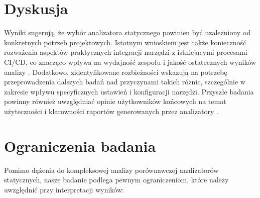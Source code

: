 \documentclass[a4paper,12pt]{article}
\begin{document}
\section{Dyskusja}
Wyniki sugerują, że wybór analizatora statycznego powinien być uzależniony od konkretnych potrzeb projektowych. Istotnym wnioskiem jest także konieczność rozważenia aspektów praktycznych integracji narzędzi z istniejącymi procesami CI/CD, co znacząco wpływa na wydajność zespołu i jakość ostatecznych wyników analizy \cite{zampetti2017how}. Dodatkowo, zidentyfikowane rozbieżności wskazują na potrzebę przeprowadzenia dalszych badań nad przyczynami takich różnic, szczególnie w zakresie wpływu specyficznych ustawień i konfiguracji narzędzi. Przyszłe badania powinny również uwzględniać opinie użytkowników końcowych na temat użyteczności i klarowności raportów generowanych przez analizatory \cite{johnson2013dont}.

\section{Ograniczenia badania}
Pomimo dążenia do kompleksowej analizy porównawczej analizatorów statycznych, nasze badanie podlega pewnym ograniczeniom, które należy uwzględnić przy interpretacji wyników:
\end{document}
